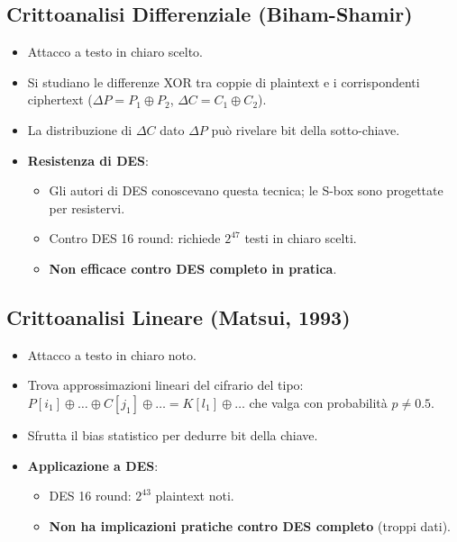 \subsection{Crittoanalisi Differenziale (Biham-Shamir)}
\begin{itemize}
    \item Attacco a testo in chiaro scelto.
    \item Si studiano le differenze XOR tra coppie di plaintext e i corrispondenti ciphertext ($\Delta P = P_1 \oplus P_2$, $\Delta C = C_1 \oplus C_2$).
    \item La distribuzione di $\Delta C$ dato $\Delta P$ può rivelare bit della sotto-chiave.
    \item \textbf{Resistenza di DES}:
    \begin{itemize}
        \item Gli autori di DES conoscevano questa tecnica; le S-box sono progettate per resistervi.
        \item Contro DES 16 round: richiede $2^{47}$ testi in chiaro scelti.
        \item \textbf{Non efficace contro DES completo in pratica}.
    \end{itemize}
\end{itemize}

\subsection{Crittoanalisi Lineare (Matsui, 1993)}
\begin{itemize}
    \item Attacco a testo in chiaro noto.
    \item Trova approssimazioni lineari del cifrario del tipo:
    $P[i_1] \oplus \dots \oplus C[j_1] \oplus \dots = K[l_1] \oplus \dots$
    che valga con probabilità $p \neq 0.5$.
    \item Sfrutta il bias statistico per dedurre bit della chiave.
    \item \textbf{Applicazione a DES}:
    \begin{itemize}
        \item DES 16 round: $2^{43}$ plaintext noti.
        \item \textbf{Non ha implicazioni pratiche contro DES completo} (troppi dati).
    \end{itemize}
\end{itemize}


